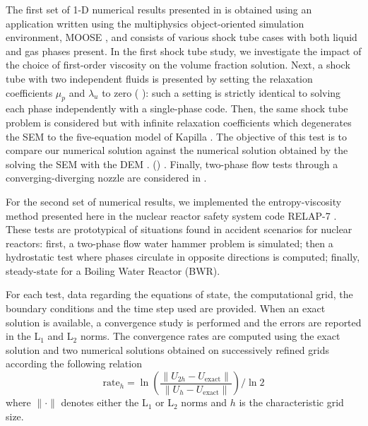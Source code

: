 \documentclass[preprint,10pt]{elsarticle}
\begin{document}
The first set  of 1-D numerical results presented in  is obtained using an application written using the multiphysics object-oriented simulation environment, MOOSE
\cite{Moose2009}, and consists of various shock tube cases with both liquid and gas phases present. 
In the first shock tube study, we investigate the impact of the choice of first-order viscosity on the volume fraction solution. 
Next, a shock tube with two independent fluids is presented by setting the relaxation coefficients $\mu_p$ and $\lambda_u$ to zero ( ): 
such a setting is strictly identical to solving each phase independently with a single-phase code. 
Then, the same shock tube problem is considered but with infinite relaxation coefficients which degenerates the SEM to the five-equation model of Kapilla \cite{Kapila_2001}. The objective of this test is to compare our numerical solution against the numerical solution obtained by the solving the SEM with the DEM \cite{Berry_NED2010}. 
() . 
Finally, two-phase flow tests through a converging-diverging nozzle are considered in . 

For the second set of numerical results, we implemented the entropy-viscosity method presented here in the nuclear reactor safety system code RELAP-7 \cite{Berry_2014}.
These tests are prototypical of situations found in accident scenarios for nuclear reactors: first, a two-phase flow water hammer problem is simulated; then a hydrostatic test 
where phases circulate in opposite directions is computed; finally, steady-state for a Boiling Water Reactor (BWR). 

For each test, data regarding the equations of state, the computational grid, the boundary conditions and the time step used are provided. When an exact solution is available, a convergence study 
is performed and the errors are reported in the L$_1$ and L$_2$ norms. 
The convergence rates are computed using the exact solution and two numerical solutions obtained on successively refined grids according the following relation 
\begin{equation}
\label{eq:conv_rates}
\text{rate}_h = \ln \left( \frac{\| U_{2h}-U_{\text{exact}} \|}{\| U_{h}-U_{\text{exact}}\| } \right) / \ln 2
\end{equation}
where $\| \cdot \|$ denotes either the L$_1$ or L$_2$ norms and $h$ is the characteristic grid size.
\end{document}
